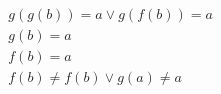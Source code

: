 \begin{align*}
%
& g(g(b)) = a \lor g(f(b)) = a
~\\~
& g(b) = a
~\\~
& f(b) = a
~\\~
& f(b)  \neq  f(b) \lor g(a)  \neq  a
%
\end{align*}
